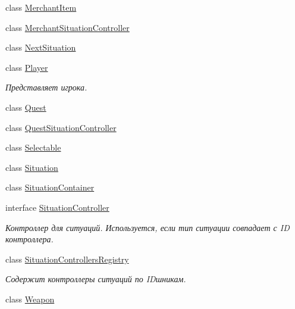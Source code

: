 \begin{DoxyCompactItemize}
class \hyperlink{class_a_s_c_i_i_wars_1_1_game_1_1_merchant_item}{Merchant\+Item}
\item 
class \hyperlink{class_a_s_c_i_i_wars_1_1_game_1_1_merchant_situation_controller}{Merchant\+Situation\+Controller}
\item 
class \hyperlink{class_a_s_c_i_i_wars_1_1_game_1_1_next_situation}{Next\+Situation}
\item 
class \hyperlink{class_a_s_c_i_i_wars_1_1_game_1_1_player}{Player}
\begin{DoxyCompactList}\small\item\em Представляет игрока. \end{DoxyCompactList}\item 
class \hyperlink{class_a_s_c_i_i_wars_1_1_game_1_1_quest}{Quest}
\item 
class \hyperlink{class_a_s_c_i_i_wars_1_1_game_1_1_quest_situation_controller}{Quest\+Situation\+Controller}
\item 
class \hyperlink{class_a_s_c_i_i_wars_1_1_game_1_1_selectable}{Selectable}
\item 
class \hyperlink{class_a_s_c_i_i_wars_1_1_game_1_1_situation}{Situation}
\item 
class \hyperlink{class_a_s_c_i_i_wars_1_1_game_1_1_situation_container}{Situation\+Container}
\item 
interface \hyperlink{interface_a_s_c_i_i_wars_1_1_game_1_1_situation_controller}{Situation\+Controller}
\begin{DoxyCompactList}\small\item\em Контроллер для ситуаций. Используется, если тип ситуации совпадает с ID контроллера. \end{DoxyCompactList}\item 
class \hyperlink{class_a_s_c_i_i_wars_1_1_game_1_1_situation_controllers_registry}{Situation\+Controllers\+Registry}
\begin{DoxyCompactList}\small\item\em Содержит контроллеры ситуаций по ID\textquotesingle{}шникам. \end{DoxyCompactList}\item 
class \hyperlink{class_a_s_c_i_i_wars_1_1_game_1_1_weapon}{Weapon}
\end{DoxyCompactItemize}

